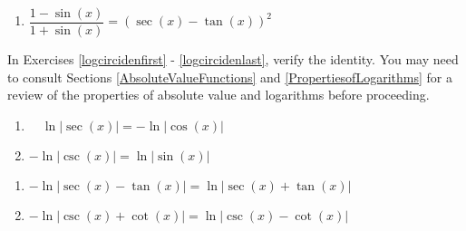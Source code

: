 \begin{multicols}{2}

\begin{enumerate}

\setcounter{enumi}{\value{HW}}

\item $\dfrac{1 - \sin(x)}{1 + \sin(x)} = (\sec(x) - \tan(x))^{2}$ \label{lastcirciden}

\setcounter{HW}{\value{enumi}}

\end{enumerate}

\end{multicols}


In Exercises \ref{logcircidenfirst} - \ref{logcircidenlast}, verify the identity.  You may need to consult Sections \ref{AbsoluteValueFunctions} and \ref{PropertiesofLogarithms} for a review of the properties of absolute value and logarithms before proceeding.

\begin{multicols}{2}

\begin{enumerate}

\setcounter{enumi}{\value{HW}}

\item  $\quad \ln|\sec(x)| = -\ln|\cos(x)|$ \label{logcircidenfirst}
\item  $-\ln|\csc(x)| = \ln|\sin(x)|$

\setcounter{HW}{\value{enumi}}

\end{enumerate}

\end{multicols}

\begin{multicols}{2}

\begin{enumerate}

\setcounter{enumi}{\value{HW}}

\item  $-\ln|\sec(x) - \tan(x)| = \ln|\sec(x)+\tan(x)|$
\item  $-\ln|\csc(x) + \cot(x)|= \ln|\csc(x) - \cot(x)|$ \label{logcircidenlast}

\setcounter{HW}{\value{enumi}}

\end{enumerate}

\end{multicols}

\newpage

